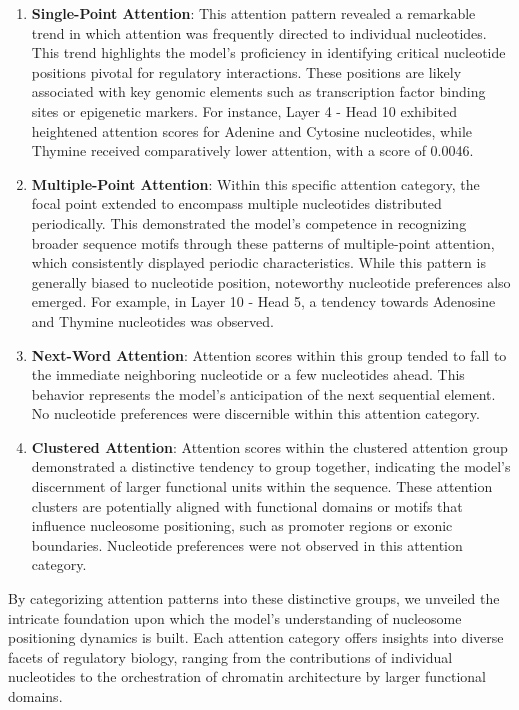 \documentclass[a4paper,fleqn]{cas-dc}
\begin{document}
\begin{enumerate}[1.]
    \item \textbf{Single-Point Attention}: This attention pattern revealed a remarkable trend in which attention was frequently directed to individual nucleotides. This trend highlights the model's proficiency in identifying critical nucleotide positions pivotal for regulatory interactions. These positions are likely associated with key genomic elements such as transcription factor binding sites or epigenetic markers. For instance, Layer 4 - Head 10 exhibited heightened attention scores for Adenine and Cytosine nucleotides, while Thymine received comparatively lower attention, with a score of 0.0046.

    \item \textbf{Multiple-Point Attention}: Within this specific attention category, the focal point extended to encompass multiple nucleotides distributed periodically. This demonstrated the model's competence in recognizing broader sequence motifs through these patterns of multiple-point attention, which consistently displayed periodic characteristics. While this pattern is generally biased to nucleotide position, noteworthy nucleotide preferences also emerged. For example, in Layer 10 - Head 5, a tendency towards Adenosine and Thymine nucleotides was observed.

    \item \textbf{Next-Word Attention}: Attention scores within this group tended to fall to the immediate neighboring nucleotide or a few nucleotides ahead. This behavior represents the model's anticipation of the next sequential element. No nucleotide preferences were discernible within this attention category.

    \item \textbf{Clustered Attention}: Attention scores within the clustered attention group demonstrated a distinctive tendency to group together, indicating the model's discernment of larger functional units within the sequence. These attention clusters are potentially aligned with functional domains or motifs that influence nucleosome positioning, such as promoter regions or exonic boundaries. Nucleotide preferences were not observed in this attention category.

\end{enumerate}

By categorizing attention patterns into these distinctive groups, we unveiled the intricate foundation upon which the model's understanding of nucleosome positioning dynamics is built. Each attention category offers insights into diverse facets of regulatory biology, ranging from the contributions of individual nucleotides to the orchestration of chromatin architecture by larger functional domains.
\end{document}
